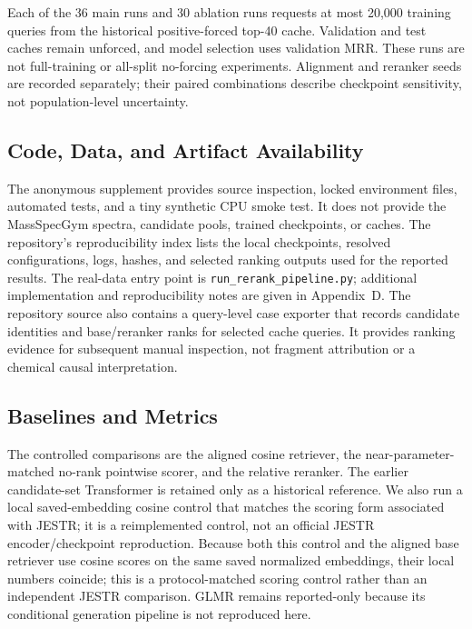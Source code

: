 \documentclass[runningheads]{llncs}
\begin{document}
Each of the 36 main runs and 30 ablation runs requests at most 20,000 training
queries from the historical positive-forced top-40 cache. Validation and test
caches remain unforced, and model selection uses validation MRR. These runs
are not full-training or all-split no-forcing experiments. Alignment and
reranker seeds are recorded separately; their paired combinations describe
checkpoint sensitivity, not population-level uncertainty.

\subsection{Code, Data, and Artifact Availability}

The anonymous supplement provides source inspection, locked environment files,
automated tests, and a tiny synthetic CPU smoke test. It does not provide the
MassSpecGym spectra, candidate pools, trained checkpoints, or caches. The
repository's reproducibility index lists the local checkpoints, resolved
configurations, logs, hashes, and selected ranking outputs used for the reported
results. The real-data entry point is
\texttt{run\_rerank\_pipeline.py}; additional implementation and
reproducibility notes are given in Appendix~D. The repository source also
contains a query-level case exporter that records candidate identities and
base/reranker ranks for selected cache queries. It provides ranking evidence
for subsequent manual inspection, not fragment attribution or a chemical
causal interpretation.

\subsection{Baselines and Metrics}

The controlled comparisons are the aligned cosine retriever, the
near-parameter-matched no-rank pointwise scorer, and the relative reranker.
The earlier candidate-set Transformer is retained only as a historical
reference. We also run a local saved-embedding
cosine control that matches the scoring form associated with JESTR; it is a
reimplemented control, not an official JESTR encoder/checkpoint reproduction.
Because both this control and the aligned base retriever use cosine scores on
the same saved normalized embeddings, their local numbers coincide; this is a
protocol-matched scoring control rather than an independent JESTR comparison.
GLMR remains reported-only because its conditional generation pipeline is not
reproduced here.
\end{document}
